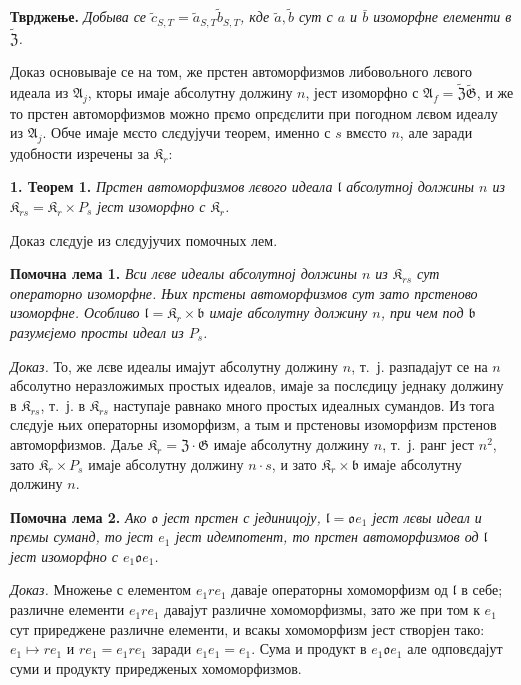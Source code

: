 \documentclass[11pt]{article}
\begin{document}
\noindent\textbf{Тврджење.} \emph{Добыва се \(\tilde c_{S,T}=\tilde a_{S,T}\tilde b_{S,T}\), кде \(\tilde a,\tilde b\) сут с \(a\) и \(\bar b\) изоморфне елементи в \(\widetilde{\mathfrak Z}\).}

Доказ основываје се на том, же прстен автоморфизмов либовољного лєвого идеала из \(\mathfrak A_j\), кторы имаје абсолутну должину \(n\), јест изоморфно с \(\mathfrak A_f=\widetilde{\mathfrak Z}\widetilde{\mathfrak G}\), и же то прстен автоморфизмов можно прємо опрєдєлити при погодном лєвом идеалу из \(\mathfrak A_j\). Обче имаје мєсто слєдујучи теорем, именно с \(s\) вмєсто \(n\), але заради удобности изречены за \(\mathfrak K_r\):

\noindent\textbf{1. Теорем 1.} \emph{Прстен автоморфизмов лєвого идеала \(\mathfrak l\) абсолутној должины \(n\) из \(\mathfrak K_{rs}=\mathfrak K_r\times P_s\) јест изоморфно с \(\mathfrak K_r\).}

Доказ слєдује из слєдујучих помочных лем.

\noindent\textbf{Помочна лема 1.} \emph{Вси лєве идеалы абсолутној должины \(n\) из \(\mathfrak K_{rs}\) сут операторно изоморфне. Њих прстены автоморфизмов сут зато прстеново изоморфне. Особливо \(\mathfrak l=\mathfrak K_r\times\mathfrak b\) имаје абсолутну должину \(n\), при чем под \(\mathfrak b\) разумєјемо просты идеал из \(P_s\).}

\noindent\emph{Доказ.} То, же лєве идеалы имајут абсолутну должину \(n\), т.~ј. разпадајут се на \(n\) абсолутно неразложимых простых идеалов, имаје за послєдицу једнаку должину в \(\mathfrak K_{rs}\), т.~ј. в \(\mathfrak K_{rs}\) наступаје равнако много простых идеалных сумандов. Из тога слєдује њих операторны изоморфизм, а тым и прстеновы изоморфизм прстенов автоморфизмов. Даље \(\mathfrak K_r=\mathfrak Z\cdot\mathfrak G\) имаје абсолутну должину \(n\), т.~ј. ранг јест \(n^2\), зато \(\mathfrak K_r\times P_s\) имаје абсолутну должину \(n\cdot s\), и зато \(\mathfrak K_r\times\mathfrak b\) имаје абсолутну должину \(n\).

\noindent\textbf{Помочна лема 2.} \emph{Ако \(\mathfrak o\) јест прстен с јединицоју, \(\mathfrak l=\mathfrak o e_1\) јест лєвы идеал и прємы суманд, то јест \(e_1\) јест идемпотент, то прстен автоморфизмов од \(\mathfrak l\) јест изоморфно с \(e_1\mathfrak o e_1\).}

\noindent\emph{Доказ.} Множење с елементом \(e_1re_1\) даваје операторны хомоморфизм од \(\mathfrak l\) в себе; различне елементи \(e_1re_1\) давајут различне хомоморфизмы, зато же при том к \(e_1\) сут приреджене различне елементи, и всакы хомоморфизм јест створјен тако: \(e_1\mapsto re_1\) и \(re_1=e_1re_1\) заради \(e_1e_1=e_1\). Сума и продукт в \(e_1\mathfrak o e_1\) але одповєдајут суми и продукту приредженых хомоморфизмов.
\end{document}
